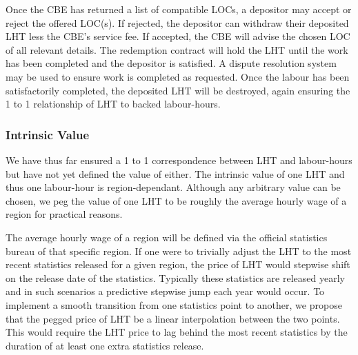 \begin{multicols}{2}
Once the CBE has returned a list of compatible LOCs, a depositor may accept or reject the offered LOC(s). If rejected, the depositor can withdraw their deposited LHT less the CBE's service fee. If accepted, the CBE will advise the chosen LOC of all relevant details. The redemption contract will hold the LHT until the work has been completed and the depositor is satisfied. A dispute resolution system may be used to ensure work is completed as requested. Once the labour has been satisfactorily completed, the deposited LHT will be destroyed, again ensuring the 1 to 1 relationship of LHT to backed labour-hours.  

\subsubsection{Intrinsic Value}
\label{sec:intrinsic-value}

We have thus far ensured a 1 to 1 correspondence between LHT and labour-hours but have not yet defined the value of either. The intrinsic value of one LHT and thus one labour-hour is region-dependant. Although any arbitrary value can be chosen, we peg the value of one LHT to be roughly the average hourly wage of a region for practical reasons. 

The average hourly wage of a region will be defined via the official statistics bureau of that specific region. If one were to trivially adjust the LHT to the most recent statistics released for a given region, the price of LHT would stepwise shift on the release date of the statistics. Typically these statistics are released yearly and in such scenarios a predictive stepwise jump each year would occur. To implement a smooth transition from one statistics point to another, we propose that the pegged price of LHT be a linear interpolation between the two points. This would require the LHT price to lag behind the most recent statistics by the duration of at least one extra statistics release.


\end{multicols}
